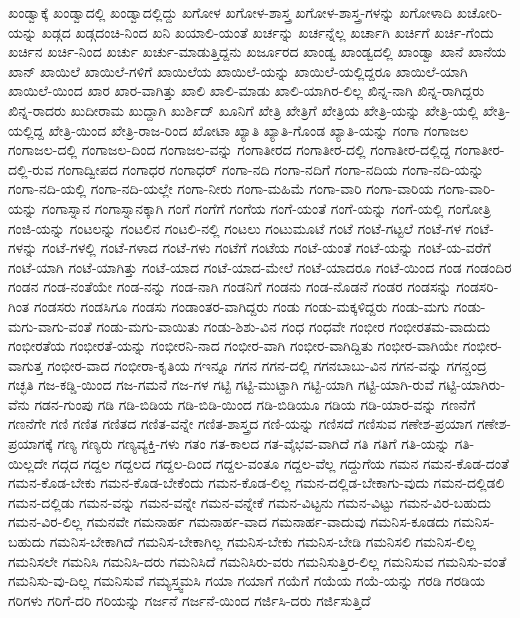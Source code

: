 {ಖಂಡ್ವಾಕ್ಕೆ
ಖಂಡ್ವಾದಲ್ಲಿ
ಖಂಡ್ವಾದಲ್ಲಿದ್ದು
ಖಗೋಳ
ಖಗೋಳ-ಶಾಸ್ತ್ರ
ಖಗೋಳ-ಶಾಸ್ತ್ರ-ಗಳನ್ನು
ಖಗೋಳಾದಿ
ಖಚೋರಿ-ಯನ್ನು
ಖಡ್ಗದ
ಖಡ್ಗದಂಚಿ-ನಿಂದ
ಖನಿ
ಖಯಾಲಿ-ಯಂತೆ
ಖರ್ಚನ್ನು
ಖರ್ಚನ್ನೆಲ್ಲ
ಖರ್ಚಾಗಿ
ಖರ್ಚಿಗೆ
ಖರ್ಚಿ-ಗೆಂದು
ಖರ್ಚಿನ
ಖರ್ಚಿ-ನಿಂದ
ಖರ್ಚು
ಖರ್ಚು-ಮಾಡುತ್ತಿದ್ದನು
ಖರ್ಜೂರದ
ಖಾಂಡ್ವ
ಖಾಂಡ್ವದಲ್ಲಿ
ಖಾಂಡ್ವಾ
ಖಾನೆ
ಖಾನೆಯ
ಖಾನ್
ಖಾಯಿಲೆ
ಖಾಯಿಲೆ-ಗಳಿಗೆ
ಖಾಯಿಲೆಯ
ಖಾಯಿಲೆ-ಯನ್ನು
ಖಾಯಿಲೆ-ಯಲ್ಲಿದ್ದರೂ
ಖಾಯಿಲೆ-ಯಾಗಿ
ಖಾಯಿಲೆ-ಯಿಂದ
ಖಾರ
ಖಾರ-ವಾಗಿತ್ತು
ಖಾಲಿ
ಖಾಲಿ-ಮಾಡು
ಖಾಲಿ-ಯಾಗಿರ-ಲಿಲ್ಲ
ಖಿನ್ನ-ನಾಗಿ
ಖಿನ್ನ-ರಾಗಿದ್ದರು
ಖಿನ್ನ-ರಾದರು
ಖುದೀರಾಮ
ಖುದ್ದಾಗಿ
ಖುರ್ಶಿದ್
ಖೂನಿಗೆ
ಖೇತ್ರಿ
ಖೇತ್ರಿಗೆ
ಖೇತ್ರಿಯ
ಖೇತ್ರಿ-ಯನ್ನು
ಖೇತ್ರಿ-ಯಲ್ಲಿ
ಖೇತ್ರಿ-ಯಲ್ಲಿದ್ದ
ಖೇತ್ರಿ-ಯಿಂದ
ಖೇತ್ರಿ-ರಾಜ-ರಿಂದ
ಖೋಟಾ
ಖ್ಯಾತಿ
ಖ್ಯಾತಿ-ಗೊಂಡ
ಖ್ಯಾತಿ-ಯನ್ನು
ಗಂಗಾ
ಗಂಗಾಜಲ
ಗಂಗಾಜಲ-ದಲ್ಲಿ
ಗಂಗಾಜಲ-ದಿಂದ
ಗಂಗಾಜಲ-ವನ್ನು
ಗಂಗಾತೀರದ
ಗಂಗಾತೀರ-ದಲ್ಲಿ
ಗಂಗಾತೀರ-ದಲ್ಲಿದ್ದ
ಗಂಗಾತೀರ-ದಲ್ಲಿ-ರುವ
ಗಂಗಾದ್ವೀಪದ
ಗಂಗಾಧರ
ಗಂಗಾಧರ್
ಗಂಗಾ-ನದಿ
ಗಂಗಾ-ನದಿಗೆ
ಗಂಗಾ-ನದಿಯ
ಗಂಗಾ-ನದಿ-ಯನ್ನು
ಗಂಗಾ-ನದಿ-ಯಲ್ಲಿ
ಗಂಗಾ-ನದಿ-ಯಲ್ಲೇ
ಗಂಗಾ-ನೀರು
ಗಂಗಾ-ಮಹಿಮೆ
ಗಂಗಾ-ವಾರಿ
ಗಂಗಾ-ವಾರಿಯ
ಗಂಗಾ-ವಾರಿ-ಯನ್ನು
ಗಂಗಾಸ್ನಾನ
ಗಂಗಾಸ್ನಾನಕ್ಕಾಗಿ
ಗಂಗೆ
ಗಂಗೆಗೆ
ಗಂಗೆಯ
ಗಂಗೆ-ಯಂತೆ
ಗಂಗೆ-ಯನ್ನು
ಗಂಗೆ-ಯಲ್ಲಿ
ಗಂಗೋತ್ರಿ
ಗಂಜಿ-ಯನ್ನು
ಗಂಟಲನ್ನು
ಗಂಟಲಿನ
ಗಂಟಲಿ-ನಲ್ಲಿ
ಗಂಟಲು
ಗಂಟುಮೂಟೆ
ಗಂಟೆ
ಗಂಟೆ-ಗಟ್ಟಲೆ
ಗಂಟೆ-ಗಳ
ಗಂಟೆ-ಗಳನ್ನು
ಗಂಟೆ-ಗಳಲ್ಲಿ
ಗಂಟೆ-ಗಳಾದ
ಗಂಟೆ-ಗಳು
ಗಂಟೆಗೆ
ಗಂಟೆಯ
ಗಂಟೆ-ಯಂತೆ
ಗಂಟೆ-ಯನ್ನು
ಗಂಟೆ-ಯ-ವರೆಗೆ
ಗಂಟೆ-ಯಾಗಿ
ಗಂಟೆ-ಯಾಗಿತ್ತು
ಗಂಟೆ-ಯಾದ
ಗಂಟೆ-ಯಾದ-ಮೇಲೆ
ಗಂಟೆ-ಯಾದರೂ
ಗಂಟೆ-ಯಿಂದ
ಗಂಡ
ಗಂಡಂದಿರ
ಗಂಡನ
ಗಂಡ-ನಂತೆಯೇ
ಗಂಡ-ನನ್ನು
ಗಂಡ-ನಾಗಿ
ಗಂಡನಿಗೆ
ಗಂಡನು
ಗಂಡ-ನೊಡನೆ
ಗಂಡರ
ಗಂಡಸನ್ನು
ಗಂಡಸರಿ-ಗಿಂತ
ಗಂಡಸರು
ಗಂಡಸಿಗೂ
ಗಂಡಸು
ಗಂಡಾಂತರ-ವಾಗಿದ್ದರು
ಗಂಡು
ಗಂಡು-ಮಕ್ಕಳಿದ್ದರು
ಗಂಡು-ಮಗು
ಗಂಡು-ಮಗು-ವಾಗು-ವಂತೆ
ಗಂಡು-ಮಗು-ವಾಯಿತು
ಗಂಡು-ಶಿಶು-ವಿನ
ಗಂಧ
ಗಂಧವೇ
ಗಂಭೀರ
ಗಂಭೀರತಮ-ವಾದುದು
ಗಂಭೀರತೆಯ
ಗಂಭೀರತೆ-ಯನ್ನು
ಗಂಭೀರನಿ-ನಾದ
ಗಂಭೀರ-ವಾಗಿ
ಗಂಭೀರ-ವಾಗಿದ್ದಿತು
ಗಂಭೀರ-ವಾಗಿಯೇ
ಗಂಭೀರ-ವಾಗುತ್ತ
ಗಂಭೀರ-ವಾದ
ಗಂಭೀರಾ-ಕೃತಿಯ
ಗಇನ್ನೂ
ಗಗನ
ಗಗನ-ದಲ್ಲಿ
ಗಗನಬಾಬು-ವಿನ
ಗಗನ-ವನ್ನು
ಗಗನ್ಚಂದ್ರ
ಗಚ್ಛತಿ
ಗಜ-ಕಡ್ಡಿ-ಯಿಂದ
ಗಜ-ಗಮನೆ
ಗಜ-ಗಳ
ಗಟ್ಟಿ
ಗಟ್ಟಿ-ಮುಟ್ಟಾಗಿ
ಗಟ್ಟಿ-ಯಾಗಿ
ಗಟ್ಟಿ-ಯಾಗಿ-ರುವೆ
ಗಟ್ಟಿ-ಯಾಗಿರು-ವೆನು
ಗಡನ-ಗುಂಪು
ಗಡಿ
ಗಡಿ-ಬಿಡಿಯ
ಗಡಿ-ಬಿಡಿ-ಯಿಂದ
ಗಡಿ-ಬಿಡಿಯೂ
ಗಡಿಯ
ಗಡಿ-ಯಾರ-ವನ್ನು
ಗಣನೆಗೆ
ಗಣನೆಗೇ
ಗಣಿ
ಗಣಿತ
ಗಣಿತದ
ಗಣಿತ-ವನ್ನೇ
ಗಣಿತ-ಶಾಸ್ತ್ರದ
ಗಣಿ-ಯನ್ನು
ಗಣಿಸದೆ
ಗಣಿಸುವ
ಗಣೇಶ-ಪ್ರಯಾಗ
ಗಣೇಶ-ಪ್ರಯಾಗಕ್ಕೆ
ಗಣ್ಯ
ಗಣ್ಯರು
ಗಣ್ಯವ್ಯಕ್ತಿ-ಗಳು
ಗತಂ
ಗತ-ಕಾಲದ
ಗತ-ವೈಭವ-ವಾಗಿದೆ
ಗತಿ
ಗತಿಗೆ
ಗತಿ-ಯನ್ನು
ಗತಿ-ಯಿಲ್ಲದೇ
ಗದ್ಗದ
ಗದ್ದಲ
ಗದ್ದಲದ
ಗದ್ದಲ-ದಿಂದ
ಗದ್ದಲ-ವಂತೂ
ಗದ್ದಲ-ವೆಲ್ಲ
ಗದ್ದುಗೆಯ
ಗಮನ
ಗಮನ-ಕೊಡ-ದಂತೆ
ಗಮನ-ಕೊಡ-ಬೇಕು
ಗಮನ-ಕೊಡ-ಬೇಕೆಂದು
ಗಮನ-ಕೊಡ-ಲಿಲ್ಲ
ಗಮನ-ದಲ್ಲಿಡ-ಬೇಕಾಗು-ವುದು
ಗಮನ-ದಲ್ಲಿಡಲಿ
ಗಮನ-ದಲ್ಲಿಡು
ಗಮನ-ವನ್ನು
ಗಮನ-ವನ್ನೇ
ಗಮನ-ವನ್ನೇಕೆ
ಗಮನ-ವಿಟ್ಟನು
ಗಮನ-ವಿಟ್ಟು
ಗಮನ-ವಿರ-ಬಹುದು
ಗಮನ-ವಿರ-ಲಿಲ್ಲ
ಗಮನವೇ
ಗಮನಾರ್ಹ
ಗಮನಾರ್ಹ-ವಾದ
ಗಮನಾರ್ಹ-ವಾದುವು
ಗಮನಿಸ-ಕೂಡದು
ಗಮನಿಸ-ಬಹುದು
ಗಮನಿಸ-ಬೇಕಾಗಿದೆ
ಗಮನಿಸ-ಬೇಕಾಗಿಲ್ಲ
ಗಮನಿಸ-ಬೇಕು
ಗಮನಿಸ-ಬೇಡಿ
ಗಮನಿಸಲಿ
ಗಮನಿಸ-ಲಿಲ್ಲ
ಗಮನಿಸಲೇ
ಗಮನಿಸಿ
ಗಮನಿಸಿ-ದರು
ಗಮನಿಸಿದೆ
ಗಮನಿಸಿರು-ವರು
ಗಮನಿಸುತ್ತಿರ-ಲಿಲ್ಲ
ಗಮನಿಸುವ
ಗಮನಿಸು-ವಂತೆ
ಗಮನಿಸು-ವು-ದಿಲ್ಲ
ಗಮನಿಸುವೆ
ಗಮ್ಯಸ್ತ್ವಮಸಿ
ಗಯಾ
ಗಯಾಗೆ
ಗಯೆಗೆ
ಗಯೆಯ
ಗಯೆ-ಯನ್ನು
ಗರಡಿ
ಗರಡಿಯ
ಗರಿಗಳು
ಗರಿಗೆ-ದರಿ
ಗರಿಯನ್ನು
ಗರ್ಜನೆ
ಗರ್ಜನೆ-ಯಿಂದ
ಗರ್ಜಿಸಿ-ದರು
ಗರ್ಜಿಸುತ್ತಿದೆ
}
